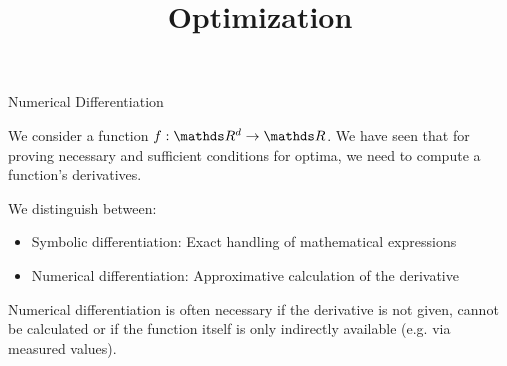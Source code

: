 





\newcommand{\titlefigure}{figure_man/hinge_vs_l2.pdf}
\newcommand{\learninggoals}{
\item Mathematical vs. Numerical Error
\item Derivative-based vs. Derivative-free}



\title{Optimization}
\date{}



\sloppy

\begin{vbframe}{Numerical Differentiation}   

  We consider a function $f: \R^d \rightarrow \R$. We have seen that for proving necessary and sufficient conditions for optima, we need to compute a function's derivatives. 
  
  \lz 
  
  We distinguish between: 
  
  \begin{itemize}
  \item Symbolic differentiation: Exact handling of mathematical expressions
  \item Numerical differentiation: Approximative calculation of the derivative
  \end{itemize}
  
  Numerical differentiation is often necessary if the derivative is not given, cannot be calculated or if the function itself is only indirectly available (e.g. via measured values).
  
  \end{vbframe}
  
